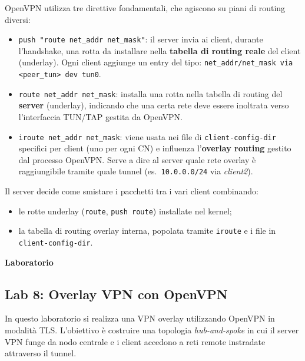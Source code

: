 OpenVPN utilizza tre direttive fondamentali, che agiscono su piani di routing diversi:
\begin{itemize}
    \item \verb|push "route net_addr net_mask"|: il server invia ai client, durante
          l’handshake, una rotta da installare nella \textbf{tabella di routing reale}
          del client (underlay). Ogni client aggiunge un entry del tipo:
          \texttt{net\_addr/net\_mask via <peer\_tun> dev tun0}.
    \item \verb|route net_addr net_mask|: installa una rotta nella tabella di routing del
          \textbf{server} (underlay), indicando che una certa rete deve essere inoltrata
          verso l’interfaccia TUN/TAP gestita da OpenVPN.
    \item \verb|iroute net_addr net_mask|: viene usata nei file di \verb|client-config-dir|
          specifici per client (uno per ogni CN) e influenza l’\textbf{overlay routing}
          gestito dal processo OpenVPN. Serve a dire al server quale rete overlay è
          raggiungibile tramite quale tunnel (es.\ \texttt{10.0.0.0/24} via \emph{client2}).
\end{itemize}

Il server decide come smistare i pacchetti tra i vari client combinando:
\begin{itemize}
    \item le rotte underlay (\verb|route|, \verb|push route|) installate nel kernel;
    \item la tabella di routing overlay interna, popolata tramite \verb|iroute| e i file in
          \verb|client-config-dir|.
\end{itemize}


\newpage
\maketitle
{\LARGE \textbf{Laboratorio}} \\[0.5em]
\subsection{Lab 8: Overlay VPN con OpenVPN}

In questo laboratorio si realizza una VPN overlay utilizzando OpenVPN in modalità TLS.
L'obiettivo è costruire una topologia \textit{hub-and-spoke} in cui il server VPN funge da nodo
centrale e i client accedono a reti remote instradate attraverso il tunnel.

